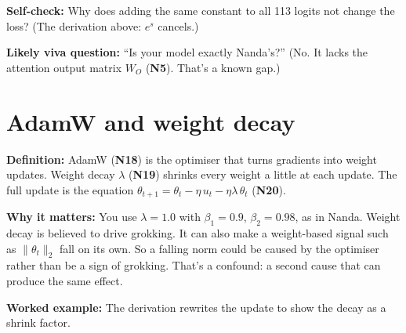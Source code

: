 \documentclass[11pt,a4paper,oneside,openany]{report}
\newcommand{\gl}[1]{\textbf{#1}}   %
\newcommand{\fdef}{\textbf{Definition:} }
\newcommand{\fwhy}{\par\textbf{Why it matters:} }
\newcommand{\fex}{\par\textbf{Worked example:} }
\newcommand{\fself}{\par\textbf{Self-check:} }
\newcommand{\fviva}{\par\textbf{Likely viva question:} }
\begin{document}
\fself Why does adding the same constant to all 113 logits not change the loss? (The derivation above: $e^s$ cancels.)
\fviva ``Is your model exactly Nanda's?'' (No. It lacks the attention output matrix $W_O$ (\gl{N5}). That's a known gap.)

\section{AdamW and weight decay}
\fdef AdamW (\gl{N18}) is the optimiser that turns gradients into weight updates. Weight decay $\lambda$ (\gl{N19}) shrinks every weight a little at each update. The full update is the equation $\theta_{t+1} = \theta_t - \eta\, u_t - \eta\lambda\, \theta_t$ (\gl{N20}).
\fwhy You use $\lambda = 1.0$ with $\beta_1 = 0.9$, $\beta_2 = 0.98$, as in Nanda. Weight decay is believed to drive grokking. It can also make a weight-based signal such as $\lVert\theta_t\rVert_2$ fall on its own. So a falling norm could be caused by the optimiser rather than be a sign of grokking. That's a confound: a second cause that can produce the same effect.
\fex The derivation rewrites the update to show the decay as a shrink factor.
\end{document}
